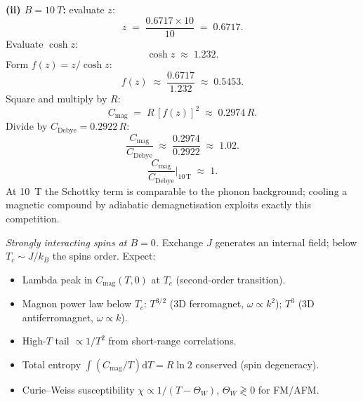 \documentclass[11pt]{article}
\newcommand{\de}{\mathrm{d}}
\begin{document}
\textbf{(ii) $B=\SI{10}{T}$:} evaluate $z$:
\[
z \;=\; \frac{0.6717\times 10}{10} \;=\; 0.6717.
\]
Evaluate $\cosh z$:
\[
\cosh z \;\approx\; 1.232.
\]
Form $f(z) = z/\cosh z$:
\[
f(z) \;\approx\; \frac{0.6717}{1.232} \;\approx\; 0.5453.
\]
Square and multiply by $R$:
\[
C_{\text{mag}} \;=\; R\,[f(z)]^2 \;\approx\; 0.2974\,R.
\]
Divide by $C_{\text{Debye}}=0.2922\,R$:
\[
\frac{C_{\text{mag}}}{C_{\text{Debye}}} \;\approx\; \frac{0.2974}{0.2922} \;\approx\; 1.02.
\]
\begin{equation}
\boxed{\;\frac{C_{\text{mag}}}{C_{\text{Debye}}}\bigg|_{10\,\mathrm{T}} \;\approx\; 1.\;}
\label{eq:rat2box}
\end{equation}
At \SI{10}{T} the Schottky term is comparable to the phonon background; cooling a magnetic compound by adiabatic demagnetisation exploits exactly this competition.

\emph{Strongly interacting spins at $B=0$.} Exchange $J$ generates an internal field; below $T_c\sim J/k_B$ the spins order. Expect:
\begin{itemize}
\item Lambda peak in $C_{\text{mag}}(T,0)$ at $T_c$ (second-order transition).
\item Magnon power law below $T_c$: $T^{3/2}$ (3D ferromagnet, $\omega\propto k^2$); $T^3$ (3D antiferromagnet, $\omega\propto k$).
\item High-$T$ tail $\propto 1/T^2$ from short-range correlations.
\item Total entropy $\int (C_{\text{mag}}/T)\de T=R\ln 2$ conserved (spin degeneracy).
\item Curie--Weiss susceptibility $\chi\propto 1/(T-\Theta_W)$, $\Theta_W\gtrless 0$ for FM/AFM.
\end{itemize}
\end{document}
